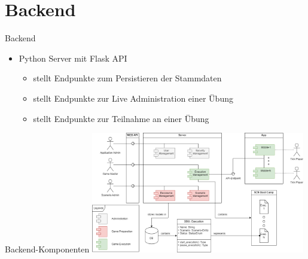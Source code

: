 \section{Backend}


\begin{frame}{Backend}
	\begin{itemize}
		\item[] Python Server mit Flask API
		\begin{itemize}
			\itemsep 4pt
			\item stellt Endpunkte zum Persistieren der Stammdaten
			\item stellt Endpunkte zur Live Administration einer Übung
			\item stellt Endpunkte zur Teilnahme an einer Übung
		\end{itemize}
	\end{itemize}
\end{frame}


\begin{frame}{Backend-Komponenten}
	\centering
	\includegraphics[width=0.7\textwidth]{images/server/component_diagram.png}
\end{frame}


